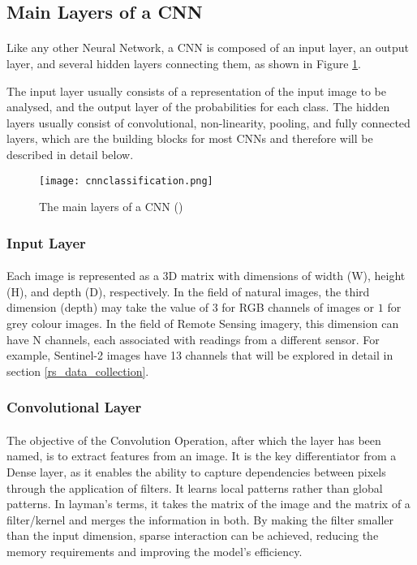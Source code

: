 \subsection{Main Layers of a \gls{CNN}} \label{cnn_layers}
\paragraph{}
Like any other Neural Network, a \gls{CNN} is composed of an input layer, an output layer, and several hidden layers connecting them, as shown in Figure \ref{fig_cnn_layers}.

The input layer usually consists of a representation of the input image to be analysed, and the output layer of the probabilities for each class.
The hidden layers usually consist of convolutional, non-linearity, pooling, and fully connected layers, which are the building blocks for most \gls{CNN}s and therefore will be described in detail below.

    \begin{figure}[hbt!]
        \centering
        \texttt{[image: cnnclassification.png]}
        \caption{The main layers of a \gls{CNN} (\cite{10.6109/JICCE.2018.16.3.173})}
        \label{fig_cnn_layers}
    \end{figure}

\subsubsection{Input Layer}
\paragraph{}
Each image is represented as a 3D matrix with dimensions of width (W), height (H), and depth (D), respectively. In the field of natural images, the third dimension (depth) may take the value of $3$ for \gls{RGB} channels of images or $1$ for grey colour images. In the field of Remote Sensing imagery, this dimension can have N channels, each associated with readings from a different sensor. For example, Sentinel-2 images have 13 channels that will be explored in detail in section \ref{rs_data_collection}. 

\subsubsection{Convolutional Layer}
\paragraph{}
The objective of the Convolution Operation, after which the layer has been named, is to extract features from an image. It is the key differentiator from a Dense layer, as it enables the ability to capture dependencies between pixels through the application of filters. It learns local patterns rather than global patterns.
In layman's terms, it takes the matrix of the image and the matrix of a filter/kernel and merges the information in both. By making the filter smaller than the input dimension, sparse interaction can be achieved, reducing the memory requirements and improving the model's efficiency.

